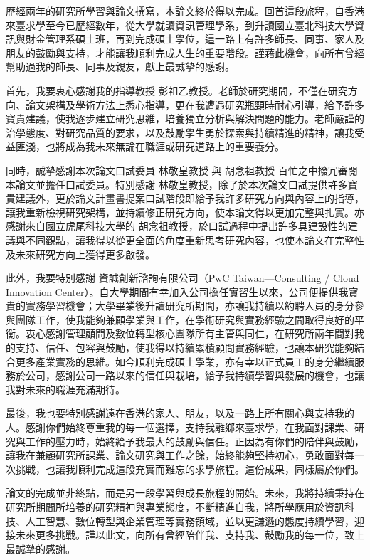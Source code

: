 \begin{Thanks}
    \text 歷經兩年的研究所學習與論文撰寫，本論文終於得以完成。回首這段旅程，自香港來臺求學至今已歷經數年，從大學就讀資訊管理學系，到升讀國立臺北科技大學資訊與財金管理系碩士班，再到完成碩士學位，這一路上有許多師長、同事、家人及朋友的鼓勵與支持，才能讓我順利完成人生的重要階段。謹藉此機會，向所有曾經幫助過我的師長、同事及親友，獻上最誠摯的感謝。
    
    \text 首先，我要衷心感謝我的指導教授 彭祖乙教授。老師於研究期間，不僅在研究方向、論文架構及學術方法上悉心指導，更在我遭遇研究瓶頸時耐心引導，給予許多寶貴建議，使我逐步建立研究思維，培養獨立分析與解決問題的能力。老師嚴謹的治學態度、對研究品質的要求，以及鼓勵學生勇於探索與持續精進的精神，讓我受益匪淺，也將成為我未來無論在職涯或研究道路上的重要養分。

    \text 同時，誠摯感謝本次論文口試委員 林敬皇教授 與 胡念祖教授 百忙之中撥冗審閱本論文並擔任口試委員。特別感謝 林敬皇教授，除了於本次論文口試提供許多寶貴建議外，更於論文計畫書提案口試階段即給予我許多研究方向與內容上的指導，讓我重新檢視研究架構，並持續修正研究方向，使本論文得以更加完整與扎實。亦感謝來自國立虎尾科技大學的 胡念祖教授，於口試過程中提出許多具建設性的建議與不同觀點，讓我得以從更全面的角度重新思考研究內容，也使本論文在完整性及未來研究方向上獲得更多啟發。

    \text 此外，我要特別感謝 資誠創新諮詢有限公司（PwC Taiwan—Consulting / Cloud Innovation Center）。自大學期間有幸加入公司擔任實習生以來，公司便提供我寶貴的實務學習機會；大學畢業後升讀研究所期間，亦讓我持續以約聘人員的身分參與團隊工作，使我能夠兼顧學業與工作，在學術研究與實務經驗之間取得良好的平衡。衷心感謝管理顧問及數位轉型核心團隊所有主管與同仁，在研究所兩年間對我的支持、信任、包容與鼓勵，使我得以持續累積顧問實務經驗，也讓本研究能夠結合更多產業實務的思維。如今順利完成碩士學業，亦有幸以正式員工的身分繼續服務於公司，感謝公司一路以來的信任與栽培，給予我持續學習與發展的機會，也讓我對未來的職涯充滿期待。

    \text 最後，我也要特別感謝遠在香港的家人、朋友，以及一路上所有關心與支持我的人。感謝你們始終尊重我的每一個選擇，支持我離鄉來臺求學，在我面對課業、研究與工作的壓力時，始終給予我最大的鼓勵與信任。正因為有你們的陪伴與鼓勵，讓我在兼顧研究所課業、論文研究與工作之餘，始終能夠堅持初心，勇敢面對每一次挑戰，也讓我順利完成這段充實而難忘的求學旅程。這份成果，同樣屬於你們。

    \text 論文的完成並非終點，而是另一段學習與成長旅程的開始。未來，我將持續秉持在研究所期間所培養的研究精神與專業態度，不斷精進自我，將所學應用於資訊科技、人工智慧、數位轉型與企業管理等實務領域，並以更謙遜的態度持續學習，迎接未來更多挑戰。謹以此文，向所有曾經陪伴我、支持我、鼓勵我的每一位，致上最誠摯的感謝。
\end{Thanks}